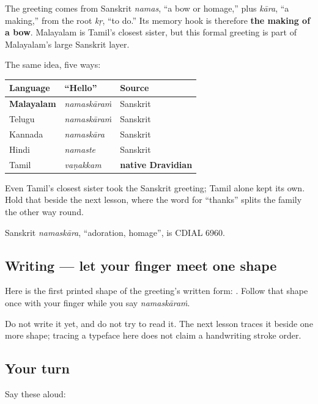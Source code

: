 \begin{cousinweb}
The greeting comes from Sanskrit \emph{namas}, “a bow or homage,” plus \emph{kāra}, “a making,” from the root \emph{kṛ}, “to do.” Its memory hook is therefore \textbf{the making of a bow}. Malayalam is Tamil's closest sister, but this formal greeting is part of Malayalam's large Sanskrit layer.

The same idea, five ways:

\noindent
\begin{tabularx}{\linewidth}{@{}>{\raggedright\arraybackslash}X>{\raggedright\arraybackslash}X>{\raggedright\arraybackslash}X@{}}
\toprule
\textbf{Language} & \textbf{\textquotedblleft{}Hello\textquotedblright{}} & \textbf{Source} \\
\midrule
\textbf{Malayalam} & \emph{namaskāraṁ} & Sanskrit \\
Telugu & \emph{namaskāraṁ} & Sanskrit \\
Kannada & \emph{namaskāra} & Sanskrit \\
Hindi & \emph{namaste} & Sanskrit \\
Tamil & \emph{vaṇakkam} & \textbf{native Dravidian} \\
\bottomrule
\end{tabularx}

Even Tamil's closest sister took the Sanskrit greeting; Tamil alone kept its own. Hold that beside the next lesson, where the word for \textquotedblleft{}thanks\textquotedblright{} splits the family the other way round.

Sanskrit \emph{namaskāra}, \textquotedblleft{}adoration, homage\textquotedblright{}, is CDIAL 6960.
\end{cousinweb}

\subsection*{Writing — let your finger meet one shape}
Here is the first printed shape of the greeting's written form: \textbf{}. Follow that shape once with your finger while you say \emph{namaskāraṁ}.

Do not write it yet, and do not try to read it. The next lesson traces it beside one more shape; tracing a typeface here does not claim a handwriting stroke order.

\subsection*{Your turn}
Say these aloud:

